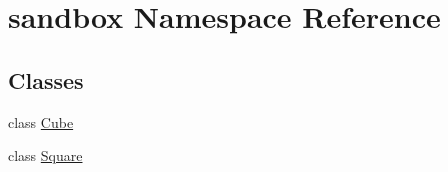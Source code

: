 \hypertarget{namespacesandbox}{}\section{sandbox Namespace Reference}
\label{namespacesandbox}
\subsection*{Classes}
\begin{DoxyCompactItemize}
\item 
class \mbox{\hyperlink{classsandbox_1_1_cube}{Cube}}
\item 
class \mbox{\hyperlink{classsandbox_1_1_square}{Square}}
\end{DoxyCompactItemize}
